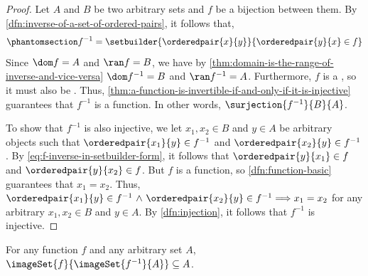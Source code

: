 \begin{proof}
    Let \( A \) and \( B \) be two arbitrary sets and \( f \) be a bijection between them.
    By \cref{dfn:inverse-of-a-set-of-ordered-pairs}, it follows that,
    \begin{equation}
        \phantomsection \label{eq:f-inverse-in-setbuilder-form}
        f^{-1} = \setbuilder{\orderedpair{x}{y}}{\orderedpair{y}{x} \in f}
    \end{equation}
    Since \( \dom f = A \) and \( \ran f = B \), we have by \cref{thm:domain-is-the-range-of-inverse-and-vice-versa}
    \( \dom f^{-1} = B \) and \( \ran f^{-1} = A \). Furthermore, \( f \) is a , so it must also be .
    Thus, \cref{thm:a-function-is-invertible-if-and-only-if-it-is-injective} guarantees that \( f^{-1} \) is a function.
    In other words, \( \surjection{f^{-1}}{B}{A} \).

    \vspace{0.3cm}
    \noindent
    To show that \( f^{-1} \) is also injective, we let \( x_{1}, x_{2} \in B \) and \( y \in A \) be arbitrary objects such that
    \( \orderedpair{x_{1}}{y} \in f^{-1} \) and \( \orderedpair{x_{2}}{y} \in f^{-1} \). By \eqref{eq:f-inverse-in-setbuilder-form},
    it follows that \( \orderedpair{y}{x_{1}} \in f \) and \( \orderedpair{y}{x_{2}} \in f \). But \( f \) is a function,
    so \cref{dfn:function-basic} guarantees that \( x_{1} = x_{2} \).
    Thus, \( \orderedpair{x_{1}}{y} \in f^{-1} \,\,{\land}\,\, \orderedpair{x_{2}}{y} \in f^{-1} {\implies} x_{1} = x_{2} \) for any
    arbitrary \( x_{1},x_{2} \in B \) and \( y \in A \).
    By \cref{dfn:injection}, it follows that \( f^{-1} \) is injective.
\end{proof}

\begin{thm}
     \label{thm:for-any-function-f-the-image-of-A-under-f-inverse-is-a-subset-of-A}
    For any function \( f \) and any arbitrary set \( A \), \( \imageSet{f}{\imageSet{f^{-1}}{A}} \subseteq A \).
\end{thm}

